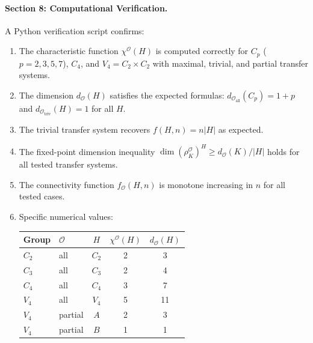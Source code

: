 
\paragraph{Section 8: Computational Verification.}

A Python verification script confirms:
\begin{enumerate}
  \item The characteristic function $\chi^{\mathcal{O}}(H)$ is computed
    correctly for $C_p$ ($p = 2, 3, 5, 7$), $C_4$, and $V_4 = C_2 \times C_2$
    with maximal, trivial, and partial transfer systems.
  \item The dimension $d_{\mathcal{O}}(H)$ satisfies the expected formulas:
    $d_{\mathcal{O}_{\mathrm{all}}}(C_p) = 1 + p$ and
    $d_{\mathcal{O}_{\mathrm{triv}}}(H) = 1$ for all $H$.
  \item The trivial transfer system recovers $f(H,n) = n|H|$ as expected.
  \item The fixed-point dimension inequality
    $\dim(\rho_K^{\mathcal{O}})^H \geq d_{\mathcal{O}}(K)/|H|$ holds
    for all tested transfer systems.
  \item The connectivity function $f_{\mathcal{O}}(H,n)$ is monotone
    increasing in $n$ for all tested cases.
  \item Specific numerical values:
    \begin{center}
    \begin{tabular}{llccc}
    \textbf{Group} & \textbf{$\mathcal{O}$} & \textbf{$H$} & \textbf{$\chi^{\mathcal{O}}(H)$} & \textbf{$d_{\mathcal{O}}(H)$} \\
    \hline
    $C_2$ & all & $C_2$ & 2 & 3 \\
    $C_3$ & all & $C_3$ & 2 & 4 \\
    $C_4$ & all & $C_4$ & 3 & 7 \\
    $V_4$ & all & $V_4$ & 5 & 11 \\
    $V_4$ & partial & $A$ & 2 & 3 \\
    $V_4$ & partial & $B$ & 1 & 1 \\
    \end{tabular}
    \end{center}
\end{enumerate}

